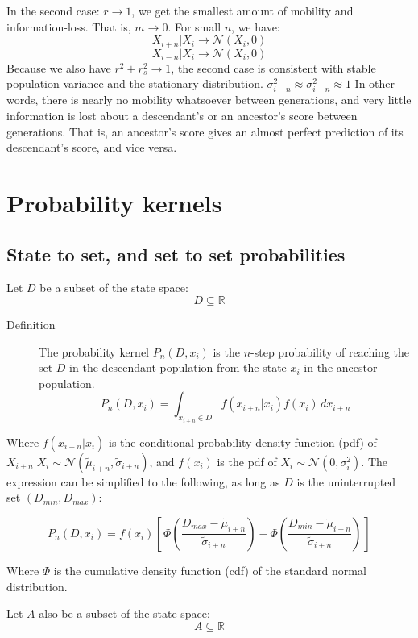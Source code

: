 \documentclass[a4paper,11pt]{article} %
\begin{document}
In the second case: $r \rightarrow 1$, we get the smallest amount of mobility and information-loss. That is, $m \rightarrow 0$. For small $n$, we have:
$$X_{i+n}|X_i \rightarrow \mathcal{N}(X_i, 0)$$
$$X_{i-n}|X_i \rightarrow \mathcal{N}(X_i, 0)$$
Because we also have $r^2 + r_s^2 \rightarrow 1$, the second case is consistent with stable population variance and the stationary distribution.
$\sigma_{i-n}^2 \approx \sigma_{i-n}^2 \approx 1$
In other words, there is nearly no mobility whatsoever between generations, and very little information is lost about a descendant's or an ancestor's score between generations. That is, an ancestor's score gives an almost perfect prediction of its descendant's score, and vice versa.




\section{Probability kernels}

\subsection{State to set, and set to set probabilities}
Let $D$ be a subset of the state space: 
%
$$D \subseteq \mathbb{R}$$

\begin{description}
\item [Definition] The probability kernel $P_n(D, x_i)$ is the $n$-step probability of reaching the set $D$ in the descendant population from the state $x_i$ in the ancestor population.
$$P_n(D, x_i) = \int_{x_{i+n}\in D}^{} f(x_{i+n}|x_i)f(x_i) \, dx_{i+n}$$
\end{description}

Where $f(x_{i+n}|x_i)$ is the conditional probability density function (pdf) of $X_{i+n}|X_i \sim \mathcal{N}( \tilde{\mu}_{i+n}, \tilde{\sigma}_{i+n})$, and $f(x_i)$ is the pdf of $X_i \sim \mathcal{N}(0, \sigma_i^2)$.
The expression can be simplified to the following, as long as $D$ is the uninterrupted set $(D_{min}, D_{max})$:

$$P_n(D, x_i) = f(x_i)[\, \Phi(\frac{D_{max}- \tilde{\mu}_{i+n}}{\tilde{\sigma}_{i+n}}) - \Phi(\frac{D_{min}- \tilde{\mu}_{i+n}}{\tilde{\sigma}_{i+n}}) \, ]$$

Where $\Phi$ is the cumulative density function (cdf) of the standard normal distribution. 

Let $A$ also be a subset of the state space:
%
$$A \subseteq \mathbb{R}$$
\end{document}
